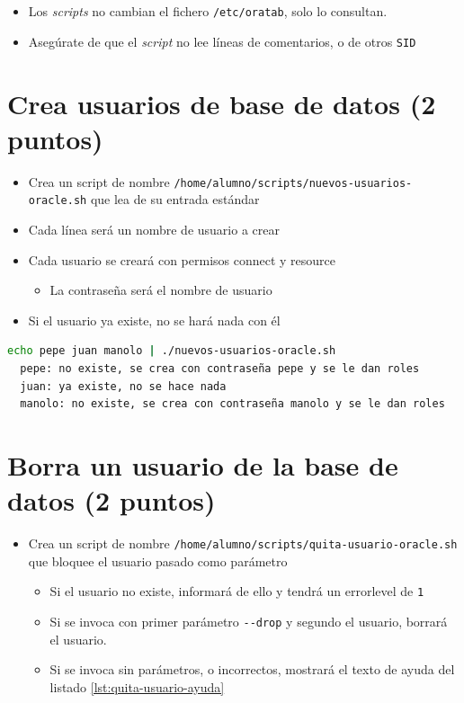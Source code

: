 \documentclass[a4paper]{article}
\begin{document}
\begin{Aviso}
\begin{itemize}
\item Los \emph{scripts} no cambian el fichero \texttt{/etc/oratab}, solo lo consultan.
\item Asegúrate de que el \emph{script} no lee líneas de comentarios, o de otros \texttt{SID}
\end{itemize}
\end{Aviso}


\section{Crea usuarios de base de datos (2 puntos)}
\label{sec:org0000006}
\begin{itemize}
\item Crea un script de nombre \texttt{/home/alumno/scripts/nuevos-usuarios-oracle.sh} que lea de su entrada estándar
\item Cada línea será un nombre de usuario a crear
\item Cada usuario se creará con permisos connect y resource
\begin{itemize}
\item La contraseña será el nombre de usuario
\end{itemize}
\item Si el usuario ya existe, no se hará nada con él
\end{itemize}

\begin{lstlisting}[language=bash,label=lst:nuevos-usuarios-ejemplo,caption={Ejemplo de uso},captionpos=b,numbers=none]
  echo pepe juan manolo | ./nuevos-usuarios-oracle.sh
  pepe: no existe, se crea con contraseña pepe y se le dan roles
  juan: ya existe, no se hace nada
  manolo: no existe, se crea con contraseña manolo y se le dan roles
\end{lstlisting}

\section{Borra un usuario de la base de datos (2 puntos)}
\label{sec:org0000009}
\begin{itemize}
\item Crea un script de nombre \texttt{/home/alumno/scripts/quita-usuario-oracle.sh} que bloquee el usuario pasado como parámetro
\begin{itemize}
\item Si el usuario no existe, informará de ello y tendrá un errorlevel de \texttt{1}
\item Si se invoca con primer parámetro \texttt{-{}-{}drop} y segundo el usuario, borrará el usuario.
\item Si se invoca sin parámetros, o incorrectos, mostrará el texto de ayuda del listado \ref{lst:quita-usuario-ayuda}
\end{itemize}
\end{itemize}
\end{document}
